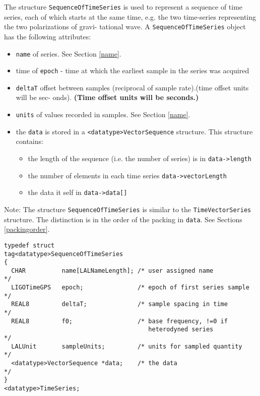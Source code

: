 \documentclass[]{ligodcc}
\begin{document}
The structure {\tt SequenceOfTimeSeries} is used to represent a sequence of
time series, each of which starts at the same time, e.g. the two
time-series representing the two polarizations of gravi- tational
wave. A  {\tt SequenceOfTimeSeries} object has the following attributes:

\begin{itemize}
\vspace{-0.15in}
\item
{\tt name} of series.  See Section \ref{name}.
\vspace{-0.15in}
\item
time of {\tt epoch} - time at which the earliest sample in the series was acquired
\vspace{-0.15in}
\item
{\tt deltaT} offset between samples (reciprocal of sample
rate).(time offset units will be sec- onds).  {\bf (Time offset units will
be seconds.)}
\vspace{-0.15in}
\item
{\tt units} of values recorded in samples. See Section \ref{name}.
\vspace{-0.15in}
\item
the {\tt data} is stored in a {\tt <datatype>VectorSequence}  structure.
This structure contains:
\begin{itemize}
\vspace{-0.10in}
\item
the length of the sequence (i.e. the number of series) is  in 
{\tt data->length}
\vspace{-0.10in}
\item
the number of elements in each time series {\tt data->vectorLength}
\vspace{-0.10in}
\item
the data it self in {\tt data->data[]}
\end{itemize}
\end{itemize}

\noindent
Note: The structure {\tt SequenceOfTimeSeries} is similar to the
{\tt TimeVectorSeries} structure. The distinction is in the order of the
packing in {\tt *data}.  See Sections \ref{packingorder}.

{\footnotesize
\begin{verbatim}
typedef struct
tag<datatype>SequenceOfTimeSeries
{
  CHAR          name[LALNameLength]; /* user assigned name           */
  LIGOTimeGPS   epoch;               /* epoch of first series sample */
  REAL8         deltaT;              /* sample spacing in time       */
  REAL8         f0;                  /* base frequency, !=0 if
                                        heterodyned series           */
  LALUnit       sampleUnits;         /* units for sampled quantity   */
  <datatype>VectorSequence *data;    /* the data                     */
}
<datatype>TimeSeries;
\end{verbatim}}
\end{document}
